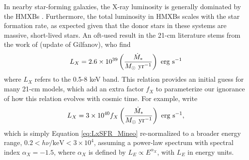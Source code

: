 In nearby star-forming galaxies, the X-ray luminosity is generally dominated by the HMXBs \cite{Gilfanov2004,Fabbiano2006,Mineo2012a}. Furthermore, the total luminosity in HMXBs scales with the star formation rate, as expected given that the donor stars in these systems are massive, short-lived stars. An oft-used result in the 21-cm literature stems from the work of \cite{Mineo2012a} (update of Gilfanov), who find
\begin{equation}
	L_X = 2.6 \times 10^{39} \left(\frac{\SFR}{M_{\odot} \ \mathrm{yr}^{-1}} \right) \ \mathrm{erg} \ \mathrm{s}^{-1} \label{eq:LxSFR_Mineo}
\end{equation}
where $L_X$ refers to the 0.5-8 keV band. This relation provides an initial guess for many 21-cm models, which add an extra factor $f_X$ to parameterize our ignorance of how this relation evolves with cosmic time. For example, \cite{Furlanetto2006} write
\begin{equation}
	L_X = 3 \times 10^{40} f_X \left(\frac{\SFR}{M_{\odot} \ \mathrm{yr}^{-1}} \right) \ \mathrm{erg} \ \mathrm{s}^{-1} , \label{eq:LxSFR_Furlanetto}
\end{equation}
which is simply Equation \ref{eq:LxSFR_Mineo} re-normalized to a broader energy range, $0.2 < h\nu/\mathrm{keV} < 3\times 10^4$, assuming a power-law spectrum with spectral index $\alpha_X=-1.5$, where $\alpha_X$ is defined by $L_E \propto E^{\alpha_X}$, with $L_E$ in energy units. 

